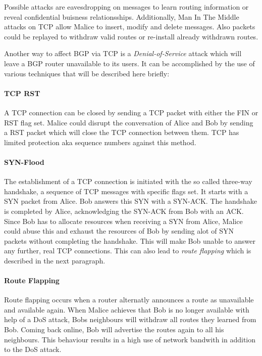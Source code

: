 \documentclass[12pt,a4paper]{IEEEtran}
\begin{document}
		Possible attacks are eavesdropping on messages to learn routing information or reveal confidential buisness relationsships.
		Additionally, Man In The Middle attacks on TCP allow Malice to insert, modify and delete messages. 
		Also packets could be replayed to withdraw valid routes or re-install already withdrawn routes.
	
		Another way to affect BGP via TCP is a \emph{Denial-of-Service} attack which will leave a BGP router unavailable to its users.
		It can be accomplished by the use of various techniques that will be described here briefly:
		\paragraph{TCP RST}
		A TCP connection can be closed by sending a TCP packet with either the FIN or RST flag set. 
		Malice could disrupt the conversation of Alice and Bob by sending a RST packet which will close the TCP connection between them. TCP has limited protection aka sequence numbers against this method. 

		\paragraph{SYN-Flood}
		The establishment of a TCP connection is initiated with the so called three-way handshake, a sequence of TCP messages with specific flags set. It starts with a SYN packet from Alice. Bob answers this SYN with a SYN-ACK. The handshake is completed by Alice, acknowledging the SYN-ACK from Bob with an ACK.
		Since Bob has to allocate resources when receiving a SYN from Alice, Malice could abuse this and exhaust the resources of Bob by sending alot of SYN packets without completing the handshake. This will make Bob unable to answer any further, real TCP connections. This can also lead to \emph{route flapping} which is described in the next paragraph.
		\paragraph{Route Flapping}
		Route flapping occurs when a router alternatly announces a route as unavailable and available again\citep{Butler2010}. When Malice achieves that Bob is no longer available with help of a DoS attack, Bobs neighbours will withdraw all routes they learned from Bob. Coming back online, Bob will advertise the routes again to all his neighbours.
		This behaviour results in a high use of network bandwith in addition to the DoS attack. 
\end{document}
